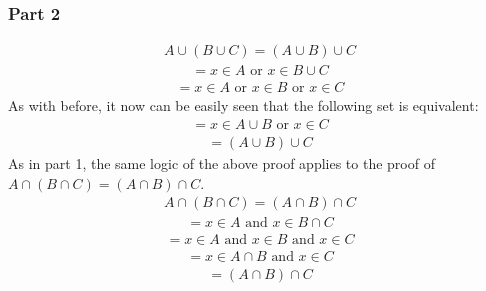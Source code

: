 \documentclass{article}
\begin{document}
\subsubsection*{Part 2}
\begin{align*}
A\cup (B\cup C) = (A\cup B) \cup C
\end{align*}
\begin{align*}
 = x \in A \text{ or } x \in B \cup C
\end{align*}
\begin{align*}
 = x \in A \text{ or } x \in B \text{ or } x \in C
\end{align*}
As with before, it now can be easily seen that the following set is equivalent:
\begin{align*}
 = x \in A \cup B \text{ or } x \in C
\end{align*}
\begin{align*}
= (A\cup B) \cup C
\end{align*}
As in part 1, the same logic of the above proof applies to the proof of $A\cap (B\cap C) = (A\cap B) \cap C$.
\begin{align*}
A\cap (B\cap C) = (A\cap B) \cap C
\end{align*}
\begin{align*}
 = x \in A \text{ and } x \in B \cap C
\end{align*}
\begin{align*}
 = x \in A \text{ and } x \in B \text{ and } x \in C
\end{align*}
\begin{align*}
 = x \in A \cap B \text{ and } x \in C
\end{align*}
\begin{align*}
\boxed{= (A\cap B) \cap C}
\end{align*}
\end{document}
